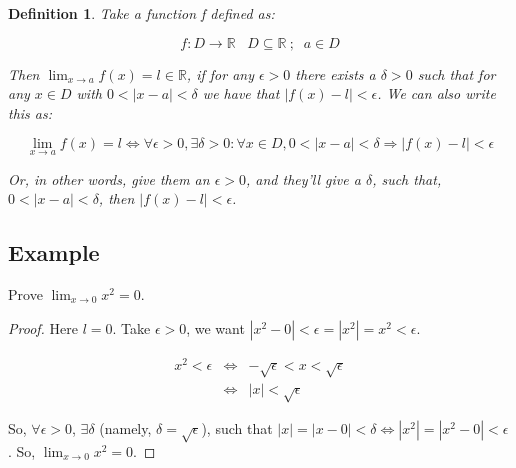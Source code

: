 \documentclass[12pt]{scrbook}
\newtheorem*{definition}{Definition}
\begin{document}
\begin{definition}

Take a function f defined as:

\[ f : D \rightarrow \mathbb{R} \;\;\; D \subseteq \mathbb{R} \ ;\;\; a \in D \]

Then 
$\lim_{x \to a} f(x) = l \in \mathbb{R}$, if for any $\epsilon > 0$  there exists a $\delta > 0$ such that for any $x \in D$ with
$0 < |x - a| < \delta$ we have that $| f(x) - l | < \epsilon $.
We can also write this as:

\[ \lim_{x \to a} f(x) = l \iff \forall \epsilon > 0,  \exists \delta > 0: \forall x \in D, 0 < | x - a | < \delta \Rightarrow | f(x) - l | < \epsilon \]

Or, in other words, give them an $\epsilon > 0$, and they'll give a $\delta$, such that, $0 < |x - a| < \delta$, then $| f(x) - l | < \epsilon $.
\end{definition}

\subsection{Example}

Prove $\lim_{x \to 0} x^2 = 0$.

\hspace{5cm}


\begin{proof}

Here $l = 0$.  Take $\epsilon > 0$, we want $ \left | x^2 - 0 \right | < \epsilon = \left | x^2 \right | = x^2 < \epsilon$.

\begin{eqnarray*}
x^2 < \epsilon &\Leftrightarrow&  -\sqrt{\epsilon} < x < \sqrt{\epsilon} \\
&\Leftrightarrow& |x| < \sqrt{\epsilon} 
\end{eqnarray*}

So, $\forall \epsilon > 0$, $\exists \delta$ (namely, $\delta = \sqrt{\epsilon}$), such that $|x| = |x - 0| < \delta \Leftrightarrow |x^2| = |x^2 - 0| < \epsilon$. So, $\lim_{x \to 0} x^2 = 0$.
\end{proof}
\end{document}
